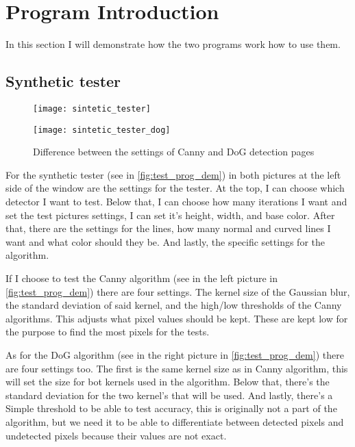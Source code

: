 \section{Program Introduction}

In this section I will demonstrate how the two programs work how to use them.

\subsection{Synthetic tester}
\label{chap:tester}

\begin{figure}[H]
\centering
\begin{minipage}[t]{.49\textwidth}
\centering
\texttt{[image: sintetic\_tester]}
\end{minipage}
\begin{minipage}[t]{.49\textwidth}
\centering
\texttt{[image: sintetic\_tester\_dog]}
\end{minipage}
\caption{Difference between the settings of \ac{Canny} and \ac{DoG} detection pages}
\label{fig:test_prog_dem}
\end{figure}

For the synthetic tester (see in \autoref{fig:test_prog_dem}) in both pictures at the left side of the window are the settings for the tester. At the top, I can choose which detector I want to test. Below that, I can choose how many iterations I want and set the test pictures settings, I can set it's height, width, and base color. After that, there are the settings for the lines, how many normal and curved lines I want and what color should they be. And lastly, the specific settings for the algorithm. 

If I choose to test the \ac{Canny} algorithm (see in the left picture in \autoref{fig:test_prog_dem}) there are four settings. The kernel size of the Gaussian blur, the standard deviation of said kernel, and the high/low thresholds of the \ac{Canny} algorithms. This adjusts what pixel values should be kept. These are kept low for the purpose to find the most pixels for the tests. 

As for the \ac{DoG} algorithm (see in the right picture in \autoref{fig:test_prog_dem}) there are four settings too. The first is the same kernel size as in \ac{Canny} algorithm, this will set the size for bot kernels used in the algorithm. Below that, there's the standard deviation for the two kernel's that will be used. And lastly, there's a Simple threshold to be able to test accuracy, this is originally not a part of the algorithm, but we need it to be able to differentiate between detected pixels and undetected pixels because their values are not exact.

